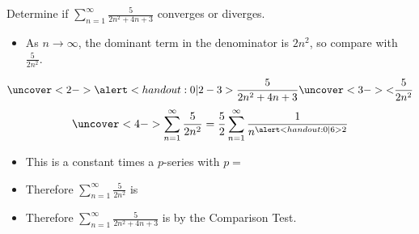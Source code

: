 \begin{frame}
\begin{example}[Example 1, p. 742]
Determine if $\sum_{n=1}^\infty \frac{5}{2n^2+4n+3}$ converges or diverges.
\begin{itemize}
\item<2->  As $n\to \infty$, the dominant term in the denominator is $2n^2$, so compare with $\frac{5}{2n^2}$.
\end{itemize}
\abovedisplayskip=0pt
\belowdisplayskip=0pt
\[
\uncover<2->{%
\alert<handout:0| 2-3>{%
\frac{5}{2n^2+4n+3} \uncover<3->{<} \frac{5}{2n^2}%
}}%
\]
\abovedisplayskip=0pt
\belowdisplayskip=0pt
\[
\uncover<4->{%
\sum_{n=1}^\infty \frac{5}{2n^2} = \frac{5}{2}\sum_{n=1}^\infty \frac{1}{n^{\alert<handout:0| 6>{2}}}%
}%
\]
\begin{itemize}
\item<5->  This is a constant times a $p$-series with \alert<handout:0| 5-6>{$p = $ }
\item<7-| alert@7-8>  Therefore $\sum_{n=1}^\infty \frac{5}{2n^2}$ is 
\item<9-| alert@9-10>  Therefore $\sum_{n=1}^\infty \frac{5}{2n^2+4n+3}$ is  by the Comparison Test.
\end{itemize}
\end{example}
\end{frame}
